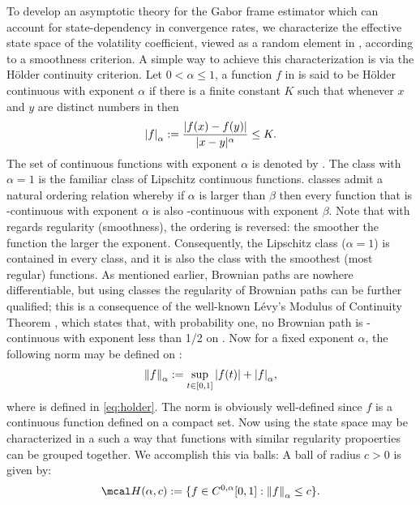 To develop an asymptotic theory for the Gabor frame estimator which can account for state-dependency in convergence rates, we characterize the effective  state space of the volatility coefficient, viewed as a random element in \state, according to a smoothness criterion.
A simple way to achieve this characterization is via the H\"older continuity criterion. Let $0 < \alpha \le 1$, a function $f$ in \state is said to be H\"older continuous with exponent $\alpha$ if  there is a finite constant $K$ such that whenever $x$ and $y$ are distinct numbers in \domain then 
\begin{align}
  {| f |}_{\alpha} := \frac{\vert f(x) - f(y)\vert}{\vert x - y \vert^\alpha} \le K. 
  \label{eq:holder}
\end{align}
The set of \holder continuous functions with exponent $\alpha$ is denoted by \calpha. The \holder class with $\alpha = 1$ is the familiar class of Lipschitz continuous functions.  \holder classes admit a natural ordering relation whereby if $\alpha$ is larger than  $\beta$ then every function that is \holder-continuous with exponent $\alpha$ is also  \holder-continuous with exponent $\beta$. Note that with regards regularity (smoothness), the ordering is reversed: the smoother the function the larger the \holder exponent. Consequently, the Lipschitz class ($ \alpha = 1$) is contained in every \holder class, and it is also the class with the smoothest (most regular) functions. As mentioned earlier, Brownian paths are nowhere differentiable, but using \holder classes the regularity of Brownian paths can be further qualified; this is a consequence of  the well-known L\'evy's Modulus of Continuity Theorem \citep[Theorem I.10.2]{Williams2000}, which states that, with probability one, no Brownian path is \holder-continuous with exponent less than 1/2 on \domain.   
Now for a fixed exponent $\alpha$, the following norm may be defined on \calpha:
\begin{align}
  {\Vert f \Vert}_{\alpha} := \sup_{t \in [0,1]} |f(t)| + {| f |}_{\alpha},\notag
  \label{}
\end{align}
where  is defined in \eqref{eq:holder}. The norm is obviously well-defined since $f$ is a continuous function defined on a compact set. Now using \hono{\cdot}  the state space may be characterized in a such a way that functions with similar regularity propoerties can be grouped together. We accomplish this via \holder balls: A \holder ball  of radius $c > 0$ is given by:
\begin{align}
  \hball{\alpha}{c}  := \{f \in \calpha : \hono{f} \le c\}.\notag
  \label{}
\end{align}
